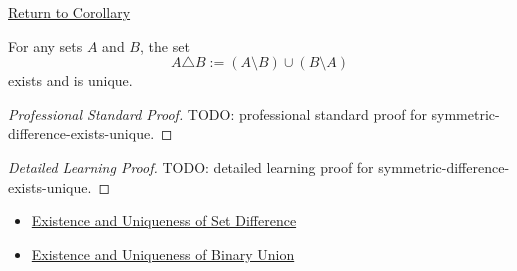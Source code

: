 \newpage
{}
\label{prf:symmetric-difference-exists-unique}

\begin{remark*}[Return]
\hyperref[cor:symmetric-difference-exists-unique]{Return to Corollary}
\end{remark*}

\begin{corollary*}
For any sets $A$ and $B$, the set
\[
  A\triangle B:=(A\setminus B)\cup(B\setminus A)
\]
exists and is unique.
\end{corollary*}

\begin{proof}[Professional Standard Proof]
\LRAProofBodyStart
TODO: professional standard proof for symmetric-difference-exists-unique.
\end{proof}

\begin{proof}[Detailed Learning Proof]
\LRAProofBodyStart
TODO: detailed learning proof for symmetric-difference-exists-unique.
\end{proof}

\begin{remark*}
\end{remark*}

\begin{dependencies}
\begin{itemize}
  \item \hyperref[cor:set-difference-exists-unique]{Existence and Uniqueness of Set Difference}
  \item \hyperref[cor:binary-union-exists-unique]{Existence and Uniqueness of Binary Union}
\end{itemize}
\end{dependencies}

\clearpage
